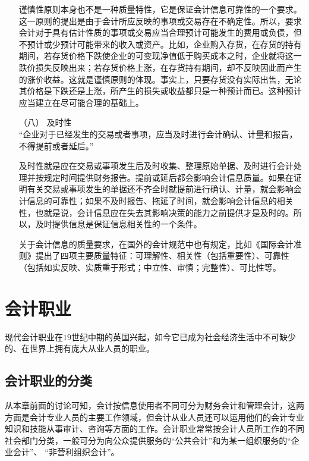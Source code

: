 \begin{enumerate}
						谨慎性原则本身也不是一种质量特性，它是保证会计信息可靠性的一个要求。这一原则的提出是由于会计所应反映的事项或交易存在不确定性。所以，要求会计对于具有估计性质的事项或交易应当合理预计可能发生的费用或负债，但不预计或少预计可能带来的收入或资产。比如，企业购入存货，在存货的持有期间，若存货价格下跌使企业的可变现净值低于购买成本之时，企业就将这一跌价损失反映出来；若存货价格上涨，在存货持有期间，却不反映因此而产生的涨价收益。这就是谨慎原则的体现。事实上，只要存货没有实际出售，无论其价格是下跌还是上涨，所产生的损失或收益都只是一种预计而已。这种预计应当建立在尽可能合理的基础上。

					\item[（八）] 及时性 \\
						“企业对于已经发生的交易或者事项，应当及时进行会计确认、计量和报告，不得提前或者延后。”
						
						及时性就是应在交易或事项发生后及时收集、整理原始单据、及时进行会计处理并按规定时间提供财务报告。提前或延后都会影响会计信息质量。如果在证明有关交易或事项发生的单据还不齐全时就提前进行确认、计量，就会影响会计信息的可靠性；如果不及时报告、拖延了时间，就会影响会计信息的相关性，也就是说，会计信息应在失去其影响决策的能力之前提供才是及时的。所以，及时提供信息是保证信息相关性的一个条件。

						关于会计信息的质量要求，在国外的会计规范中也有规定，比如《国际会计准则》提出了四项主要质量特征：可理解性、相关性（包括重要性）、可靠性（包括如实反映、实质重于形式；中立性、审慎；完整性）、可比性等。

				\end{enumerate}

			\section{会计职业}
				现代会计职业在$19$世纪中期的英国兴起，如今它已成为社会经济生活中不可缺少的、在世界上拥有庞大从业人员的职业。

				\subsection{会计职业的分类}

				从本章前面的讨论可知，会计按信息使用者不同可分为财务会计和管理会计，这两方面是会计专业人员的主要工作领域，但会计从业人员还可以运用他们的会计专业知识和技能从事审计、咨询等方面的工作。会计职业常常按会计人员所工作的不同社会部门分类，一般可分为向公众提供服务的“公共会计”和为某一组织服务的“企业会计”、 “非营利组织会计”。

